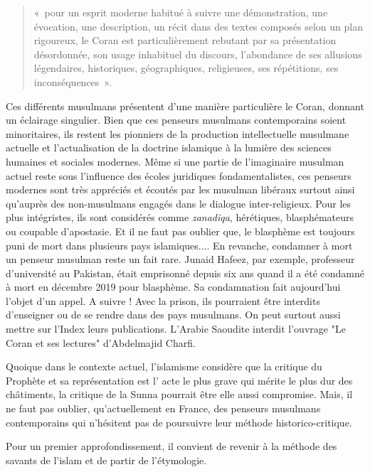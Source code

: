 \begin{quote}
«~pour un esprit moderne habitué à suivre une démonstration, une
évocation, une description, un récit dans des textes composés selon un
plan rigoureux, le Coran est particulièrement rebutant par sa
présentation désordonnée, son usage inhabituel du discours, l'abondance
de ses allusions légendaires, historiques, géographiques, religieuses,
ses répétitions, ses inconséquences~».
\end{quote}
Ces différents musulmans présentent d'une manière particulière le Coran,
donnant un éclairage singulier.
Bien que ces penseurs musulmans contemporains soient minoritaires, ils restent les pionniers de la production intellectuelle musulmane actuelle et l'actualisation de la doctrine islamique à la lumière des sciences humaines et sociales modernes. Même si une partie de l'imaginaire musulman actuel reste sous l'influence des écoles juridiques fondamentalistes, ces penseurs modernes sont très appréciés et écoutés par les musulman libéraux surtout ainsi qu'auprès des non-musulmans engagés dans le dialogue inter-religieux.   
Pour les plus intégristes, ils sont considérés comme \textit{zanadiqa}, hérétiques, blasphémateurs ou coupable d'apostasie. Et il ne faut pas oublier que, le blasphème est toujours puni de mort dans plusieurs pays islamiques.... En revanche, condamner à mort un penseur musulman reste un fait rare. Junaid Hafeez, par exemple, professeur d’université au Pakistan, était emprisonné depuis six ans quand il a été condamné à mort en décembre 2019 pour blasphème. Sa condamnation fait aujourd'hui l'objet d'un appel. A suivre ! Avec la prison, ils pourraient être interdits d'enseigner ou de se rendre dans des pays musulmans. On peut surtout aussi mettre sur l'Index leurs publications. L'Arabie Saoudite interdit l'ouvrage "Le Coran et ses lectures" d'Abdelmajid Charfi. 

Quoique dans le contexte actuel, l’islamisme considère que la critique du Prophète et sa représentation est l' acte le plus grave qui mérite le plus dur des châtiments, la critique de la Sunna pourrait être elle aussi compromise. Mais, il ne faut pas oublier, qu'actuellement en France, des penseurs musulmans contemporains qui n'hésitent pas de poursuivre leur méthode historico-critique. 

 Pour un premier approfondissement, il
convient de revenir à la méthode des savants de l'islam et de partir de
l'étymologie.


